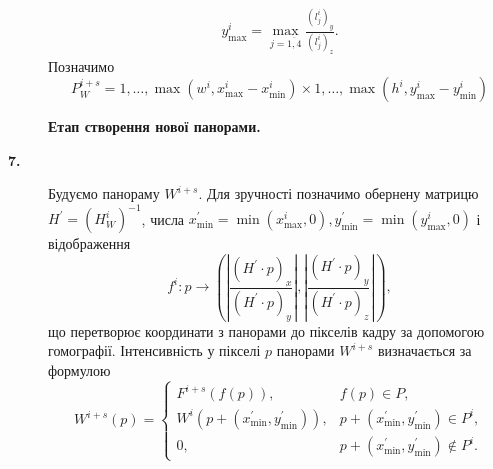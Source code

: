 \begin{description}
\begin{multline*}
            y_{\max}^{i} = \max_{j = \overline{1,4}}\frac{( l_{j}^{i} )_{y}}{( l_{j}^{i} )_{z}}.
        \end{multline*}
        Позначимо
        \begin{equation*}
            P_{W}^{i + s} =
            { 1,\ldots,\max( w^{i},x_{\max}^{i} - x_{\min}^{i} ) }
            \times
            { 1,\ldots,\max( h^{i},y_{\max}^{i} - y_{\min}^{i} ) }
        \end{equation*}
    \item[] \textbf{Етап створення нової панорами.}
    \item[\textbf{7.}]
        Будуємо панораму $W^{i+s}$. Для зручності позначимо обернену матрицю \\
        $H^{'} = (H_{W}^{i})^{-1}$, числа
        $x_{\min}^{'} = \min(x_{\max}^{i}, 0), y_{\min}^{'} = \min(y_{\max}^{i}, 0)$ і відображення
        \begin{equation*}
            f^i: p \rightarrow
            \left( \left| \frac{(H^{'} \cdot p)_x}{(H^{'} \cdot p)_y} \right|, \left| \frac{(H^{'} \cdot p)_y}{(H^{'} \cdot p)_z} \right| \right),
        \end{equation*}
        що перетворює координати з панорами до пікселів кадру за допомогою гомографії.
        Інтенсивність у пікселі $p$ панорами
        $W^{i+s}$ визначається за формулою
        \begin{equation*}
            W^{i + s}(p) =
            \begin{cases}
                F^{i + s}(f(p)),                            & f(p) \in P,                                    \\
                W^{i}( p + ( x_{\min}^{'},y_{\min}^{'} ) ), & p + ( x_{\min}^{'},y_{\min}^{'} ) \in P^{i},   \\
                0,                                          & p + ( x_{\min}^{'},y_{\min}^{'} ) \notin P^{i}.
            \end{cases}
        \end{equation*}
\end{description}